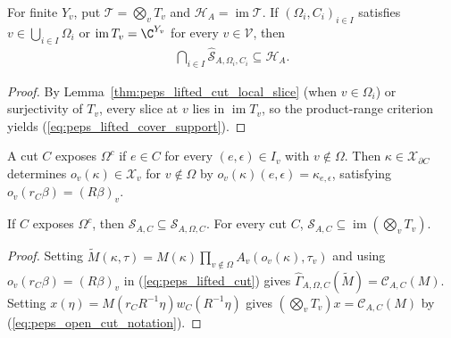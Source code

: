 \begin{lemma}%
    \label{thm:peps_lifted_cover_support}
    \leanok
    For finite $Y_v$, put $\mathcal T=\bigotimes_vT_v$ and
    $\mathcal H_A=\operatorname{im}\mathcal T$. If $(\Omega_i,C_i)_{i\in I}$
    satisfies $v\in\bigcup_{i\in I}\Omega_i$ or $\operatorname{im}T_v=\C^{Y_v}$
    for every $v\in\mathcal V$, then
    \begin{align}
        \bigcap_{i\in I}\widehat{\mathcal S}_{A,\Omega_i,C_i}
        \subseteq\mathcal H_A.
        \label{eq:peps_lifted_cover_support}
    \end{align}
\end{lemma}
\begin{proof}\leanok
    By Lemma~\ref{thm:peps_lifted_cut_local_slice} (when $v\in\Omega_i$) or
    surjectivity of $T_v$, every slice at $v$ lies in $\operatorname{im}T_v$,
    so the product-range criterion yields (\ref{eq:peps_lifted_cover_support}).
\end{proof}

\begin{definition}%
    \label{def:peps_outside_cut_config}
    \leanok
    A cut $C$ exposes $\Omega^c$ if $e\in C$ for every $(e,\epsilon)\in I_v$
    with $v\notin\Omega$. Then $\kappa\in\mathcal X_{\partial C}$ determines
    $o_v(\kappa)\in\mathcal X_v$ for $v\notin\Omega$ by
    $o_v(\kappa)(e,\epsilon)=\kappa_{e,\epsilon}$, satisfying
    $o_v(r_C\beta)=(R\beta)_v$.
\end{definition}

\begin{lemma}%
    \label{thm:peps_full_cut_in_lifted_support}
    \leanok
    If $C$ exposes $\Omega^c$, then
    $\mathcal S_{A,C}\subseteq\widehat{\mathcal S}_{A,\Omega,C}$.
    For every cut $C$,
    $\mathcal S_{A,C}\subseteq\operatorname{im}(\bigotimes_vT_v)$.
\end{lemma}
\begin{proof}\leanok
    Setting $\widetilde M(\kappa,\tau)=M(\kappa)\prod_{v\notin\Omega}A_v(o_v(\kappa),\tau_v)$
    and using $o_v(r_C\beta)=(R\beta)_v$ in (\ref{eq:peps_lifted_cut}) gives
    $\widehat\Gamma_{A,\Omega,C}(\widetilde M)=\mathcal C_{A,C}(M)$.
    Setting $x(\eta)=M(r_CR^{-1}\eta)w_C(R^{-1}\eta)$ gives
    $(\bigotimes_vT_v)x=\mathcal C_{A,C}(M)$ by (\ref{eq:peps_open_cut_notation}).
\end{proof}

